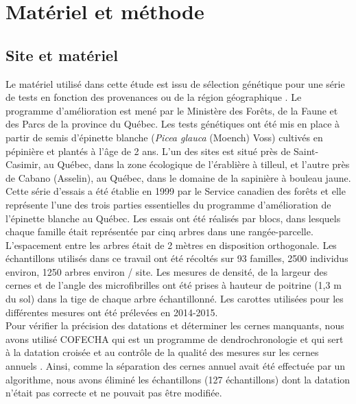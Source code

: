 \documentclass[a4paper,12pt]{report}
\begin{document}
\section{Matériel et méthode}

\subsection*{Site et matériel}\label{matériel}

Le matériel utilisé dans cette étude est issu de sélection génétique pour une série de tests en fonction des provenances ou de la région géographique \citep{Beaulieu1996}. Le programme d’amélioration est mené par le Ministère des Forêts, de la Faune et des Parcs de la province du Québec. Les tests génétiques ont été mis en place à partir de semis d'épinette blanche (\textit{Picea glauca} (Moench) Voss) cultivés en pépinière et plantés à l'âge de 2 ans. L'un des sites est situé près de Saint-Casimir, au Québec, dans la zone écologique de l'érablière à tilleul, et l'autre près de Cabano (Asselin), au Québec, dans le domaine de la sapinière à bouleau jaune. Cette série d'essais a été établie en 1999 par le Service canadien des forêts et elle représente l'une des trois parties essentielles du programme d'amélioration de l'épinette blanche au Québec. Les essais ont été réalisés par blocs, dans lesquels chaque famille était représentée par cinq arbres dans une rangée-parcelle. L'espacement entre les arbres était de 2 mètres en disposition orthogonale. Les échantillons utilisés dans ce travail ont été récoltés sur 93 familles, 2500  individus environ, 1250 arbres environ / site. Les mesures de densité, de la largeur des cernes et de l'angle des microfibrilles ont été prises à hauteur de poitrine (1,3 m du sol) dans la tige de chaque arbre échantillonné. Les carottes utilisées pour les différentes mesures ont été prélevées en 2014-2015.  \\ 

Pour vérifier la précision des datations et déterminer les cernes manquants, nous avons utilisé COFECHA qui est un programme de dendrochronologie et qui sert à la datation croisée et au contrôle de la qualité des mesures sur les cernes annuels \citep{HOLMES1983}. Ainsi, comme la séparation des cernes annuel avait été effectuée par un algorithme, nous avons éliminé les échantillons (127 échantillons) dont la datation n'était pas correcte et ne pouvait pas être modifiée. %
\end{document}
